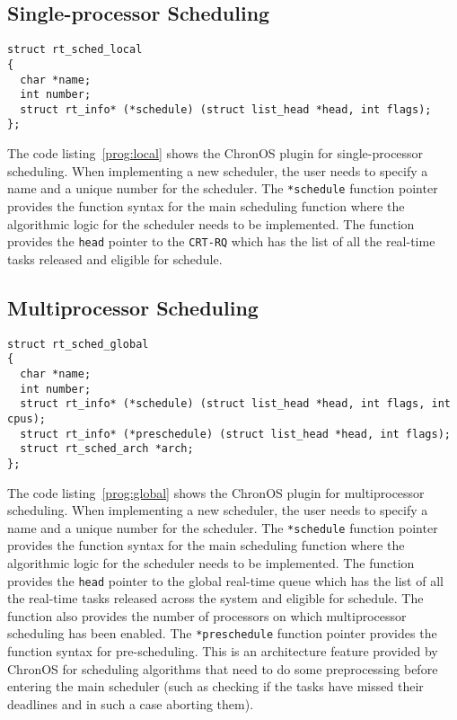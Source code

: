 \documentclass[12pt,dvips]{report}
\begin{document}
\subsection{Single-processor Scheduling}

\begin{lstlisting}[caption=ChronOS Single-processor Scheduler Plugin, label=prog:local]
struct rt_sched_local
{
  char *name;
  int number;
  struct rt_info* (*schedule) (struct list_head *head, int flags);
};
\end{lstlisting}

The code listing~\ref{prog:local} shows the ChronOS plugin for single-processor scheduling. When implementing a new scheduler, the user needs to specify a name and a unique number for the scheduler. The \texttt{*schedule} function pointer provides the function syntax for the main scheduling function where the algorithmic logic for the scheduler needs to be implemented. The function provides the \texttt{head} pointer to the \texttt{CRT-RQ} which has the list of all the real-time tasks released and eligible for schedule.

\subsection{Multiprocessor Scheduling}

\begin{lstlisting}[caption=ChronOS Multiprocessor Scheduler Plugin, label=prog:global]
struct rt_sched_global
{
  char *name;
  int number;
  struct rt_info* (*schedule) (struct list_head *head, int flags, int cpus);
  struct rt_info* (*preschedule) (struct list_head *head, int flags);
  struct rt_sched_arch *arch;
};
\end{lstlisting}

The code listing~\ref{prog:global} shows the ChronOS plugin for multiprocessor scheduling. When implementing a new scheduler, the user needs to specify a name and a unique number for the scheduler. The \texttt{*schedule} function pointer provides the function syntax for the main scheduling function where the algorithmic logic for the scheduler needs to be implemented. The function provides the \texttt{head} pointer to the global real-time queue which has the list of all the real-time tasks released across the system and eligible for schedule. The function also provides the number of processors on which multiprocessor scheduling has been enabled. The \texttt{*preschedule} function pointer provides the function syntax for pre-scheduling. This is an architecture feature provided by ChronOS for scheduling algorithms that need to do some preprocessing before entering the main scheduler (such as checking if the tasks have missed their deadlines and in such a case aborting them). 
\end{document}
